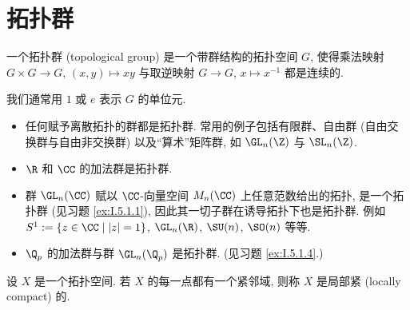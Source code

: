 

\section{拓扑群}

\begin{definition}
\label{def:I.1.1}
一个拓扑群 (topological group) 是一个带群结构的拓扑空间 $G$, 使得乘法映射
$G \times G \to G$, $(x,y) \longmapsto xy$ 与取逆映射 $G \to G$, $x \longmapsto x^{-1}$ 都是连续的.
\end{definition}

我们通常用 $1$ 或 $e$ 表示 $G$ 的单位元.

\begin{example}[拓扑群的例子]
\label{exa:I.1.2}
\begin{itemize}
\item 任何赋予离散拓扑的群都是拓扑群. 常用的例子包括有限群、自由群 (自由交换群与自由非交换群) 以及``算术''矩阵群, 如 $\GL_n(\Z)$ 与 $\SL_n(\Z)$.
\item $\R$ 和 $\CC$ 的加法群是拓扑群.
\item 群 $\GL_n(\CC)$ 赋以 $\CC$-向量空间 $M_n(\CC)$ 上任意范数给出的拓扑, 是一个拓扑群 (见习题 \ref{ex:I.5.1.1}), 因此其一切子群在诱导拓扑下也是拓扑群. 例如 $S^1 := \{z \in \CC \mid |z| = 1\}$, $\GL_n(\R)$, $\SU(n)$, $\SO(n)$ 等等.
\item $\Q_p$ 的加法群与群 $\GL_n(\Q_p)$ 是拓扑群. (见习题 \ref{ex:I.5.1.4}.)
\end{itemize}
\end{example}

\begin{definition}
\label{def:I.1.3}
设 $X$ 是一个拓扑空间. 若 $X$ 的每一点都有一个紧邻域, 则称 $X$ 是局部紧 (locally compact) 的.
\end{definition}

